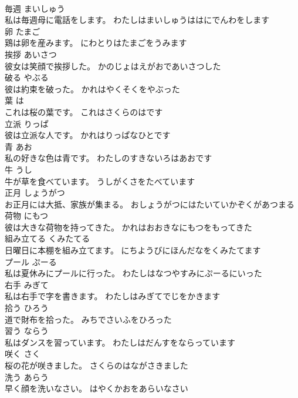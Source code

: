 \documentclass[8pt]{extreport}
\begin{document}
\begin{CJK}{UTF8}{min}
\\	毎週	まいしゅう	
\\	私は毎週母に電話をします。	わたしはまいしゅうははにでんわをします	
\\	卵	たまご	
\\	鶏は卵を産みます。	にわとりはたまごをうみます	
\\	挨拶	あいさつ	
\\	彼女は笑顔で挨拶した。	かのじょはえがおであいさつした	
\\	破る	やぶる	
\\	彼は約束を破った。	かれはやくそくをやぶった	
\\	葉	は	
\\	これは桜の葉です。	これはさくらのはです	
\\	立派	りっぱ	
\\	彼は立派な人です。	かれはりっぱなひとです	
\\	青	あお	
\\	私の好きな色は青です。	わたしのすきないろはあおです	
\\	牛	うし	
\\	牛が草を食べています。	うしがくさをたべています	
\\	正月	しょうがつ	
\\	お正月には大抵、家族が集まる。	おしょうがつにはたいていかぞくがあつまる	
\\	荷物	にもつ	
\\	彼は大きな荷物を持ってきた。	かれはおおきなにもつをもってきた	
\\	組み立てる	くみたてる	
\\	日曜日に本棚を組み立てます。	にちようびにほんだなをくみたてます	
\\	プール	ぷーる	
\\	私は夏休みにプールに行った。	わたしはなつやすみにぷーるにいった	
\\	右手	みぎて	
\\	私は右手で字を書きます。	わたしはみぎてでじをかきます	
\\	拾う	ひろう	
\\	道で財布を拾った。	みちでさいふをひろった	
\\	習う	ならう	
\\	私はダンスを習っています。	わたしはだんすをならっています	
\\	咲く	さく	
\\	桜の花が咲きました。	さくらのはながさきました	
\\	洗う	あらう	
\\	早く顔を洗いなさい。	はやくかおをあらいなさい	

\end{CJK}
\end{document}
